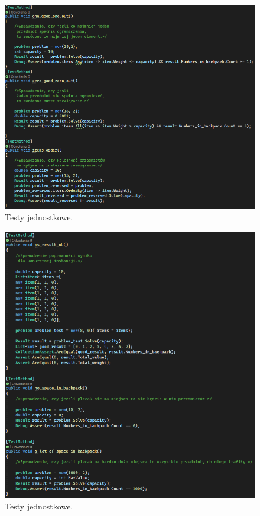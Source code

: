 \documentclass{report}
\begin{document}
\begin{figure}[H]%
	\centering
	\includegraphics[scale=0.6]{zdj/test_first}
	\caption{Testy jednostkowe.}
\end{figure}

\begin{figure}[H]%
	\centering
	\includegraphics[scale=0.6]{zdj/test_second}
	\caption{Testy jednostkowe.}
\end{figure}
\end{document}
